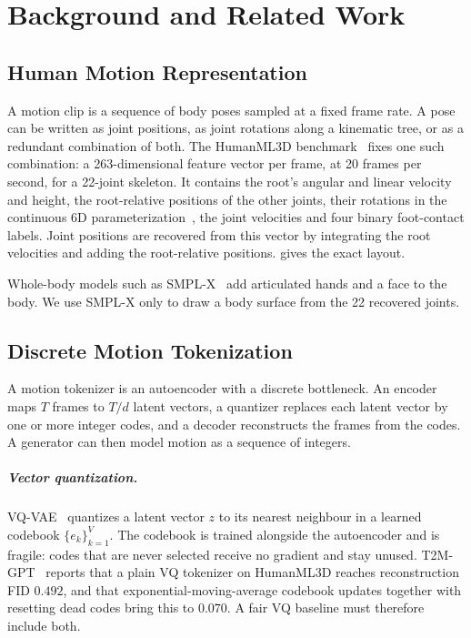 \chapter{Background and Related Work}
\label{chap:background}

\section{Human Motion Representation}
\label{sec:bg_representation}

A motion clip is a sequence of body poses sampled at a fixed frame rate. A pose can be written as joint positions, as joint rotations along a kinematic tree, or as a redundant combination of both. The HumanML3D benchmark~\cite{guo2022humanml3d} fixes one such combination: a 263-dimensional feature vector per frame, at 20 frames per second, for a 22-joint skeleton. It contains the root's angular and linear velocity and height, the root-relative positions of the other joints, their rotations in the continuous 6D parameterization~\cite{zhou2019continuity}, the joint velocities and four binary foot-contact labels. Joint positions are recovered from this vector by integrating the root velocities and adding the root-relative positions.  gives the exact layout.

Whole-body models such as SMPL-X~\cite{pavlakos2019smplx} add articulated hands and a face to the body. We use SMPL-X only to draw a body surface from the 22 recovered joints.

\section{Discrete Motion Tokenization}
\label{sec:bg_tokenization}

A motion tokenizer is an autoencoder with a discrete bottleneck. An encoder maps $T$ frames to $T/d$ latent vectors, a quantizer replaces each latent vector by one or more integer codes, and a decoder reconstructs the frames from the codes. A generator can then model motion as a sequence of integers.

\paragraph{Vector quantization.} VQ-VAE~\cite{oord2017vqvae} quantizes a latent vector $z$ to its nearest neighbour in a learned codebook $\{e_k\}_{k=1}^{V}$. The codebook is trained alongside the autoencoder and is fragile: codes that are never selected receive no gradient and stay unused. T2M-GPT~\cite{zhang2023t2mgpt} reports that a plain VQ tokenizer on HumanML3D reaches reconstruction FID $0.492$, and that exponential-moving-average codebook updates together with resetting dead codes bring this to $0.070$. A fair VQ baseline must therefore include both.

